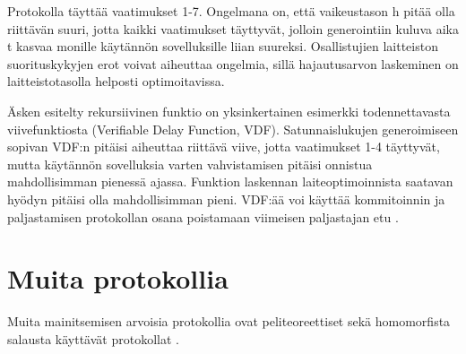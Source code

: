 Protokolla täyttää vaatimukset 1-7. Ongelmana on, että vaikeustason h pitää olla riittävän suuri, jotta kaikki vaatimukset täyttyvät, jolloin generointiin kuluva aika t kasvaa monille käytännön sovelluksille liian suureksi. Osallistujien laitteiston suorituskykyjen erot voivat aiheuttaa ongelmia, sillä hajautusarvon laskeminen on laitteistotasolla helposti optimoitavissa.

Äsken esitelty rekursiivinen funktio on yksinkertainen esimerkki todennettavasta viivefunktiosta (Verifiable Delay Function, VDF). Satunnaislukujen generoimiseen sopivan VDF:n pitäisi aiheuttaa riittävä viive, jotta vaatimukset 1-4 täyttyvät, mutta käytännön sovelluksia varten vahvistamisen pitäisi onnistua mahdollisimman pienessä ajassa. Funktion laskennan laiteoptimoinnista saatavan hyödyn pitäisi olla mahdollisimman pieni. VDF:ää voi käyttää kommitoinnin ja paljastamisen protokollan osana poistamaan viimeisen paljastajan etu \cite{boneh_verifiable_2018}.

\section{Muita protokollia}
Muita mainitsemisen arvoisia protokollia ovat peliteoreettiset sekä homomorfista salausta käyttävät protokollat \cite{simic_review_2020}. 